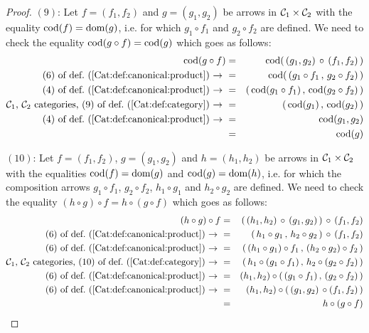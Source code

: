 \begin{proof}
    $(9)$: Let $f=(f_{1},f_{2})$ and $g=(g_{1},g_{2})$ be arrows in $\mbox{${\cal C}_{1}$}\times
    \mbox{${\cal C}_{2}$}$ with the equality $\mbox{\rm cod}(f)=\mbox{\rm dom}(g)$, i.e. for which $g_{1}\circ f_{1}$
    and $g_{2}\circ f_{2}$ are defined. We need to check the equality
    $\mbox{\rm cod}(g\circ f) = \mbox{\rm cod}(g)$ which goes as follows:
        \begin{eqnarray*}\cod(g\circ f)
            &=&\cod(\,(g_{1},g_{2})\,\circ\,(f_{1},f_{2})\,)\\
            \mbox{$(6)$ of def.~(\ref{Cat:def:canonical:product})\ $\to$\ }
            &=&\cod(\,(g_{1}\circ f_{1}\,,\,g_{2}\circ f_{2})\,)\\
            \mbox{$(4)$ of def.~(\ref{Cat:def:canonical:product})\ $\to$\ }
            &=&(\,\cod(g_{1}\circ f_{1})\,,\,\cod(g_{2}\circ f_{2})\,)\\
            \mbox{\Cone,\ \Ctwo\ categories, 
                $(9)$ of def.~(\ref{Cat:def:category})\ $\to$\ }
            &=&(\,\cod(g_{1})\,,\,\cod(g_{2})\,)\\
            \mbox{$(4)$ of def.~(\ref{Cat:def:canonical:product})\ $\to$\ }
            &=&\cod(g_{1},g_{2})\\
            &=&\cod(g)
        \end{eqnarray*}

    $(10)$: Let $f=(f_{1},f_{2})$, $g=(g_{1},g_{2})$ and $h=(h_{1},h_{2})$ be
    arrows in $\mbox{${\cal C}_{1}$}\times\mbox{${\cal C}_{2}$}$ with the equalities $\mbox{\rm cod}(f)=\mbox{\rm dom}(g)$ and
    $\mbox{\rm cod}(g)=\mbox{\rm dom}(h)$, i.e. for which the composition arrows $g_{1}\circ f_{1}$,
    $g_{2}\circ f_{2}$, $h_{1}\circ g_{1}$ and $h_{2}\circ g_{2}$ are defined.
    We need to check the equality $(h\circ g)\circ f=h\circ(g\circ f)$ 
    which goes as follows:
        \begin{eqnarray*}(h\circ g)\circ f
            &=&(\,(h_{1},h_{2})\,\circ\,(g_{1},g_{2})\,)\,\circ\,(f_{1},f_{2})\\ 
            \mbox{$(6)$ of def.~(\ref{Cat:def:canonical:product})\ $\to$\ }
            &=&(\,h_{1}\circ g_{1}\,,\,h_{2}\circ g_{2}\,)\,\circ\,(f_{1},f_{2})\\
            \mbox{$(6)$ of def.~(\ref{Cat:def:canonical:product})\ $\to$\ }
            &=&(\,(h_{1}\circ g_{1})\circ f_{1}\,,\,
                   (h_{2}\circ g_{2})\circ f_{2}\,)\\
            \mbox{\Cone,\ \Ctwo\ categories, 
                $(10)$ of def.~(\ref{Cat:def:category})\ $\to$\ }
            &=&(\,h_{1}\circ (g_{1}\circ f_{1})\,,\,
                   h_{2}\circ(g_{2}\circ f_{2})\,)\\
            \mbox{$(6)$ of def.~(\ref{Cat:def:canonical:product})\ $\to$\ }
            &=&(h_{1},h_{2})\circ(\,(g_{1}\circ f_{1})\,,\,(g_{2}\circ f_{2})\,)\\
            \mbox{$(6)$ of def.~(\ref{Cat:def:canonical:product})\ $\to$\ }
            &=&(h_{1},h_{2})\circ(\,(g_{1},g_{2})\,\circ(f_{1},f_{2})\,)\\
            &=&h\circ(g\circ f)
        \end{eqnarray*}


\end{proof}

